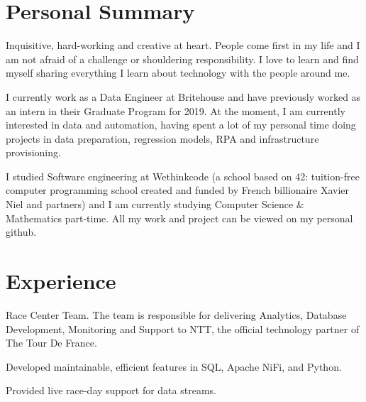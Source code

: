 \documentclass[]{deedy-resume-openfont}
\begin{document}
\begin{minipage}[t]{0.66\textwidth} 



\section{Personal Summary}

Inquisitive, hard-working and creative at heart. People come first in my life and I am not afraid of a challenge or shouldering responsibility. I love to learn and find myself sharing everything I learn about technology with the people around me. 
\sectionsep

I currently work as a Data Engineer at Britehouse and have previously worked as an intern in their Graduate Program for 2019. At the moment, I am currently interested in data and automation, having spent a lot of my personal time doing projects in data preparation, regression models, RPA and infrastructure provisioning.
\sectionsep

I studied Software engineering at Wethinkcode (a school based on  42: tuition-free computer programming school created and funded by French billionaire Xavier Niel and partners) and I am currently studying Computer Science \& Mathematics part-time. All my work and project can be viewed on my personal github.  
\sectionsep




\section{Experience}
\vspace{\topsep} %
\begin{tightemize}
\item Race Center Team. The team is
responsible for delivering Analytics, Database Development, Monitoring and Support to NTT, the official technology partner of The Tour De France.
\item Developed maintainable, efficient features in SQL, Apache NiFi, and
Python. 
\item Provided live race-day support for data streams.
\end{tightemize}
\sectionsep


\end{minipage}
\end{document}
